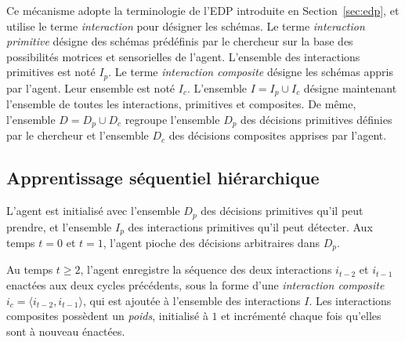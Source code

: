 Ce mécanisme adopte la terminologie de l'EDP introduite en Section~\ref{sec:edp}, et utilise le terme \emph{interaction} pour désigner les schémas.
Le terme \emph{interaction primitive} désigne des schémas prédéfinis par le chercheur sur la base des possibilités motrices et sensorielles de l'agent.
L'ensemble des interactions primitives est noté $I_p$.
Le terme \emph{interaction composite} désigne les schémas appris par l'agent. 
Leur ensemble est noté $I_c$.
L'ensemble $I = I_p \cup I_c$ désigne maintenant l'ensemble de toutes les interactions, primitives et composites.
De même, l'ensemble $D = D_p \cup D_c$ regroupe l'ensemble $D_p$ des décisions primitives définies par le chercheur et l'ensemble $D_c$ des décisions composites apprises par l'agent.  







\subsection{Apprentissage séquentiel hiérarchique}

\noindent
L'agent est initialisé avec l'ensemble $D_p$ des décisions primitives qu'il peut prendre, et l'ensemble $I_p$ des interactions primitives qu'il peut détecter.
Aux temps $t= 0$ et $t=1$, l'agent pioche des décisions arbitraires dans $D_p$.


Au temps $t \ge 2 $, l'agent enregistre la séquence des deux interactions $i_{t-2}$ et $i_{t-1}$ enactées aux deux cycles précédents, sous la forme d'une \emph{interaction composite} $i_c = \langle i_{t-2}, i_{t-1} \rangle$, qui est ajoutée à l'ensemble des interactions $I$. 
Les interactions composites possèdent un \emph{poids}, initialisé à $1$  et incrémenté chaque fois qu'elles sont à nouveau énactées.

